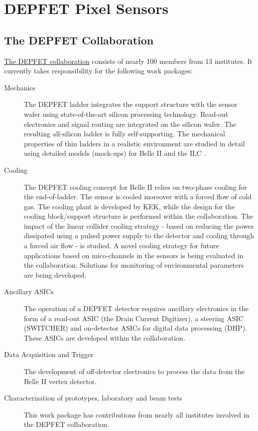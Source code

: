\section{DEPFET Pixel Sensors}

\subsection{The DEPFET Collaboration}
\href{http://www.hll.mpg.de/twiki/bin/view/DEPFET/CollaborationList}{The DEPFET collaboration} consists of nearly 100 members from 13 institutes. It currently takes responsibility for the following work packages:
\begin{description}
\item[Mechanics] {The DEPFET ladder integrates the support structure with the sensor wafer using state-of-the-art silicon processing technology. Read-out electronics and signal routing are integrated on the silicon wafer. The resulting all-silicon ladder is fully self-supporting. The mechanical properties of thin ladders in a realistic environment are studied in detail using detailed models (mock-ups) for Belle II and the ILC .}
\item[Cooling] {The DEPFET cooling concept for Belle II relies on two-phase  cooling for the end-of-ladder. The sensor is cooled moreover with a forced flow of cold gas. The  cooling plant is developed by KEK, while the design for the cooling block/support structure is performed within the collaboration. The impact of the linear collider cooling strategy - based on reducing the power dissipated using a pulsed power supply to the detector and cooling through a forced air flow - is studied. A novel cooling strategy for future applications based on mico-channels in the sensors is being evaluated in the collaboration. Solutions for monitoring of environmental parameters are being developed.}
\item[Ancillary ASICs] {The operation of a DEPFET detector requires ancillary electronics in the form of a read-out ASIC (the Drain Current Digitizer), a steering ASIC (SWITCHER) and on-detector ASICs for digital data processing (DHP). These ASICs are developed within the collaboration.}
\item[Data Acquisition and Trigger] {The development of off-detector electronics to process the data from the Belle II vertex detector.}
\item[Characterization of prototypes, laboratory and beam tests] {This work package has contributions from nearly all institutes involved in the DEPFET collaboration.}
\end{description}

